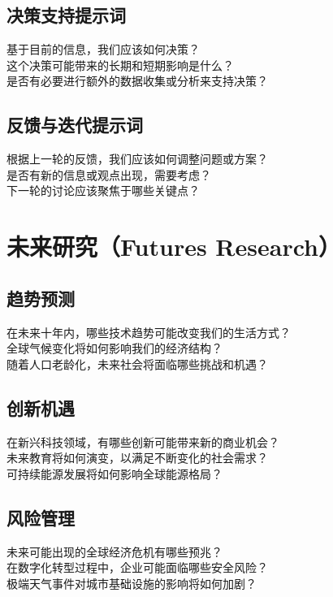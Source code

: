 \documentclass[12pt]{book}
\begin{document}
\subsection{决策支持提示词}
基于目前的信息，我们应该如何决策？\\
这个决策可能带来的长期和短期影响是什么？\\
是否有必要进行额外的数据收集或分析来支持决策？\\

\subsection{反馈与迭代提示词}
根据上一轮的反馈，我们应该如何调整问题或方案？\\
是否有新的信息或观点出现，需要考虑？\\
下一轮的讨论应该聚焦于哪些关键点？\\

\section{未来研究（Futures Research）}
\subsection{趋势预测}
在未来十年内，哪些技术趋势可能改变我们的生活方式？\\
全球气候变化将如何影响我们的经济结构？\\
随着人口老龄化，未来社会将面临哪些挑战和机遇？\\

\subsection{创新机遇}
在新兴科技领域，有哪些创新可能带来新的商业机会？\\
未来教育将如何演变，以满足不断变化的社会需求？\\
可持续能源发展将如何影响全球能源格局？\\

\subsection{风险管理}
未来可能出现的全球经济危机有哪些预兆？\\
在数字化转型过程中，企业可能面临哪些安全风险？\\
极端天气事件对城市基础设施的影响将如何加剧？\\
\end{document}
